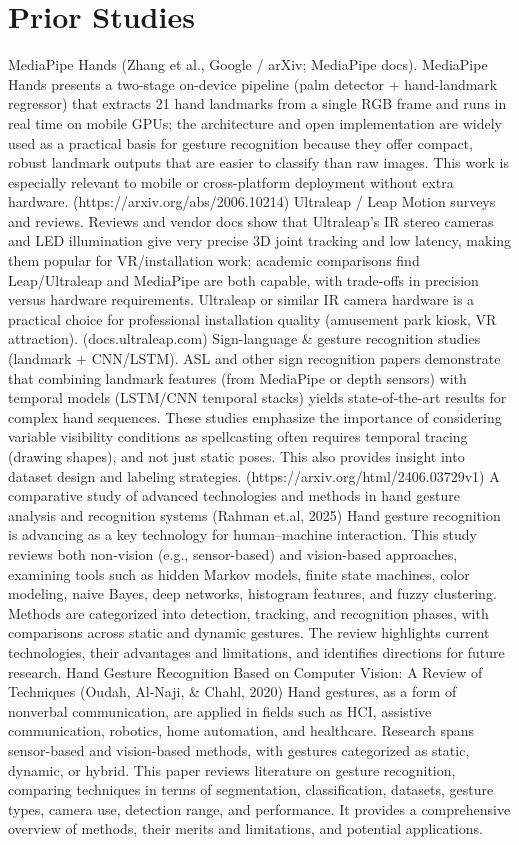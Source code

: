 \section{Prior Studies}
MediaPipe Hands (Zhang et al., Google / arXiv; MediaPipe docs).
 MediaPipe Hands presents a two-stage on-device pipeline (palm detector + hand-landmark regressor) that extracts 21 hand landmarks from a single RGB frame and runs in real time on mobile GPUs; the architecture and open implementation are widely used as a practical basis for gesture recognition because they offer compact, robust landmark outputs that are easier to classify than raw images. This work is especially relevant to mobile or cross-platform deployment without extra hardware. (https://arxiv.org/abs/2006.10214)
Ultraleap / Leap Motion surveys and reviews.
 Reviews and vendor docs show that Ultraleap’s IR stereo cameras and LED illumination give very precise 3D joint tracking and low latency, making them popular for VR/installation work; academic comparisons find Leap/Ultraleap and MediaPipe are both capable, with trade-offs in precision versus hardware requirements. Ultraleap or similar IR camera hardware is a practical choice for professional installation quality (amusement park kiosk, VR attraction). (docs.ultraleap.com)
Sign-language & gesture recognition studies (landmark + CNN/LSTM).
 ASL and other sign recognition papers demonstrate that combining landmark features (from MediaPipe or depth sensors) with temporal models (LSTM/CNN temporal stacks) yields state-of-the-art results for complex hand sequences. These studies emphasize the importance of considering variable visibility conditions as spellcasting often requires temporal tracing (drawing shapes), and not just static poses. This also provides insight into dataset design and labeling strategies. (https://arxiv.org/html/2406.03729v1)
A comparative study of advanced technologies and methods in hand gesture analysis and recognition systems (Rahman et.al, 2025)
Hand gesture recognition is advancing as a key technology for human–machine interaction. This study reviews both non-vision (e.g., sensor-based) and vision-based approaches, examining tools such as hidden Markov models, finite state machines, color modeling, naive Bayes, deep networks, histogram features, and fuzzy clustering. Methods are categorized into detection, tracking, and recognition phases, with comparisons across static and dynamic gestures. The review highlights current technologies, their advantages and limitations, and identifies directions for future research.
Hand Gesture Recognition Based on Computer Vision: A Review of Techniques (Oudah, Al-Naji, & Chahl, 2020)
Hand gestures, as a form of nonverbal communication, are applied in fields such as HCI, assistive communication, robotics, home automation, and healthcare. Research spans sensor-based and vision-based methods, with gestures categorized as static, dynamic, or hybrid. This paper reviews literature on gesture recognition, comparing techniques in terms of segmentation, classification, datasets, gesture types, camera use, detection range, and performance. It provides a comprehensive overview of methods, their merits and limitations, and potential applications.

